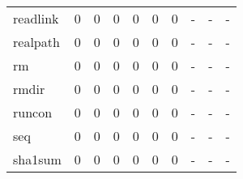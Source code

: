 \begin{longtable}{lp{2.0cm}p{2.0cm}p{2.0cm}p{2.0cm}p{2.0cm}p{2.0cm}p{2.0cm}p{2.0cm}p{2.0cm}}
readlink  &                      0 &                                             0 &                                            0 &                                           0 &                                            0 &                                          0 &                                    - &                                      - &                                    - \\
realpath  &                      0 &                                             0 &                                            0 &                                           0 &                                            0 &                                          0 &                                    - &                                      - &                                    - \\
rm        &                      0 &                                             0 &                                            0 &                                           0 &                                            0 &                                          0 &                                    - &                                      - &                                    - \\
rmdir     &                      0 &                                             0 &                                            0 &                                           0 &                                            0 &                                          0 &                                    - &                                      - &                                    - \\
runcon    &                      0 &                                             0 &                                            0 &                                           0 &                                            0 &                                          0 &                                    - &                                      - &                                    - \\
seq       &                      0 &                                             0 &                                            0 &                                           0 &                                            0 &                                          0 &                                    - &                                      - &                                    - \\
sha1sum   &                      0 &                                             0 &                                            0 &                                           0 &                                            0 &                                          0 &                                    - &                                      - &                                    - \\

\end{longtable}
